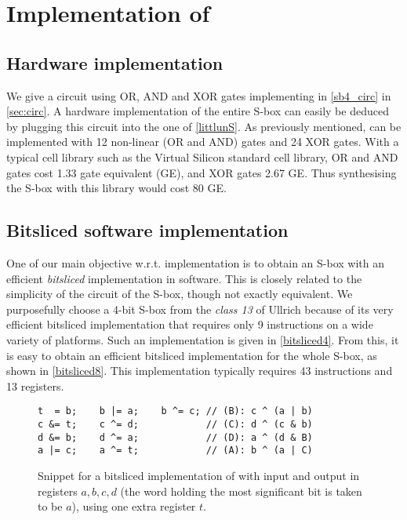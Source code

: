 \section{Implementation of \littlunOne}
\label{sec:implem}

\subsection{Hardware implementation}
We give a circuit using OR, AND and XOR gates implementing \littlunS in \autoref{sb4_circ} in \autoref{sec:circ}.
A hardware implementation of the entire S-box can easily be deduced by plugging this circuit into the one of \autoref{littlunS}.
As previously mentioned, \littlunOne can be implemented with 12 non-linear (OR and AND) gates and 24 XOR gates. With a typical cell library
such as the Virtual Silicon standard cell library, OR and AND gates cost 1.33 gate equivalent (GE), and XOR gates 2.67 GE. Thus synthesising
the S-box with this library would cost 80 GE. 

\subsection{Bitsliced software implementation}
One of our main objective w.r.t. implementation is to obtain an S-box with an efficient \emph{bitsliced} implementation in
software. This is closely related to the simplicity of the circuit of the S-box, though not exactly equivalent.
We purposefully choose a 4-bit S-box from the \emph{class 13} of Ullrich \etal \cite{skew} because of its very
efficient bitsliced implementation that requires only 9 instructions
on a wide variety of platforms.
Such an implementation is given in \autoref{bitsliced4}.
From this, it is easy to obtain an efficient bitsliced implementation for the whole S-box, as shown in \autoref{bitsliced8}.
This implementation typically requires 43 instructions and 13 registers.

\begin{figure}[ht]
\begin{verbatim}
t  = b;    b |= a;    b ^= c; // (B): c ^ (a | b)
c &= t;    c ^= d;            // (C): d ^ (c & b)
d &= b;    d ^= a;            // (D): a ^ (d & B)
a |= c;    a ^= t;            // (A): b ^ (a | C)
\end{verbatim}
\caption[Snippet for a bitsliced \C implementation of \littlunS.]{Snippet for a bitsliced \C implementation of \littlunS \label{bitsliced4} with input and output in registers $a,b,c,d$ (the word holding the most significant bit is taken to be $a$), using one extra register $t$.}
\end{figure}

